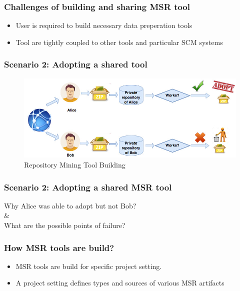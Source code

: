         \begin{frame}
            \frametitle{Challenges of building and sharing MSR tool}
            \begin{itemize}
                \item User is required to build necessary data preperation tools
                \item Tool are tightly coupled to other tools and particular SCM systems
             \end{itemize}
        \end{frame}

        \begin{frame}
            \frametitle{Scenario 2: Adopting a shared tool}
            \begin{figure}
                \centering
                \includegraphics[scale=0.35]{figures/adopting.jpg}
                \caption{Repository Mining Tool Building}
            \end{figure}
        \end{frame}


        \begin{frame}
            \frametitle{Scenario 2: Adopting a shared MSR tool}
             \centering
                Why Alice was able to adopt but not Bob? \\
                \& \\
                What are the possible points of failure?
        \end{frame}


        \begin{frame}
            \frametitle{How MSR tools are build?}
            \begin{itemize}
                \item MSR tools are build for specific project setting.
                \item A project setting defines types and sources of various MSR artifacts
            \end{itemize}
        \end{frame}

